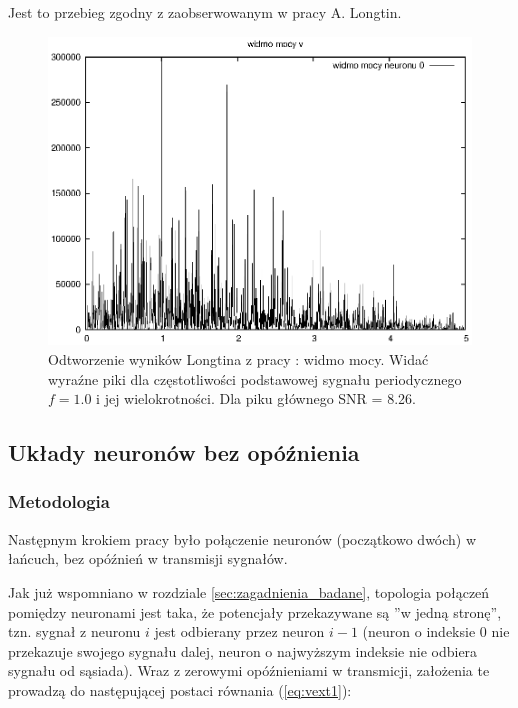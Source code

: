   Jest to przebieg zgodny z zaobserwowanym w pracy A. Longtin.

  \begin{figure}
    \includegraphics[width=140mm]{images/1neuron/3}
    \caption{Odtworzenie wyników Longtina z pracy \cite{longtin}: widmo mocy. Widać wyraźne piki dla częstotliwości podstawowej sygnału periodycznego $f=1.0$ i jej wielokrotności. Dla piku głównego SNR = 8.26.}
    \label{graphics:sym1fft}
  \end{figure}

  
  \subsection{Układy neuronów bez opóźnienia}
  \label{sec:uklad_bez_opoznienia}

  \subsubsection{Metodologia}
  
  Następnym krokiem pracy było połączenie neuronów (początkowo dwóch) w łańcuch, bez opóźnień w transmisji sygnałów.

  Jak już wspomniano w rozdziale \ref{sec:zagadnienia_badane}, topologia połączeń pomiędzy neuronami jest taka, że potencjały przekazywane są ''w jedną stronę'', tzn. sygnał z neuronu $i$ jest odbierany przez neuron $i-1$ (neuron o indeksie 0 nie przekazuje swojego sygnału dalej, neuron o najwyższym indeksie nie odbiera sygnału od sąsiada). Wraz z zerowymi opóźnieniami w transmicji, założenia te prowadzą do następującej postaci równania (\ref{eq:vext1}):

